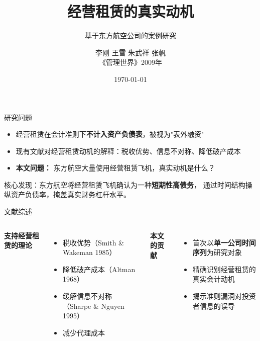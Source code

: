 \documentclass[aspectratio=169]{beamer}
\title{经营租赁的真实动机}
\subtitle{基于东方航空公司的案例研究}
\author{李刚 \quad 王雪 \quad 朱武祥 \quad 张帆 \\[4pt]
\small 《管理世界》2009年}
\date{\today}
\newenvironment{resultbox}{\begin{tcolorbox}[colframe=nankai,colback=nankai!5,fonttitle=\bfseries]}{\end{tcolorbox}}
\begin{document}
\maketitle

\begin{frame}{研究问题}
\begin{itemize}
  \item 经营租赁在会计准则下\textbf{不计入资产负债表}，被视为"表外融资"
  \item 现有文献对经营租赁动机的解释：税收优势、信息不对称、降低破产成本
  \item \textbf{本文问题：} 东方航空大量使用经营租赁飞机，真实动机是什么？
\end{itemize}

\begin{resultbox}
核心发现：东方航空将经营租赁飞机确认为一种\textbf{短期性高债务}，
通过时间结构操纵资产负债率，掩盖真实财务杠杆水平。
\end{resultbox}
\end{frame}

\begin{frame}{文献综述}
\begin{columns}[T]
\textbf{支持经营租赁的理论}
\begin{itemize}
  \item 税收优势（Smith \& Wakeman 1985）
  \item 降低破产成本（Altman 1968）
  \item 缓解信息不对称（Sharpe \& Nguyen 1995）
  \item 减少代理成本
\end{itemize}

\textbf{本文的贡献}
\begin{itemize}
  \item 首次以\textbf{单一公司时间序列}为研究对象
  \item 精确识别经营租赁的真实会计动机
  \item 揭示准则漏洞对投资者信息的误导
\end{itemize}
\end{columns}
\end{frame}
\end{document}
